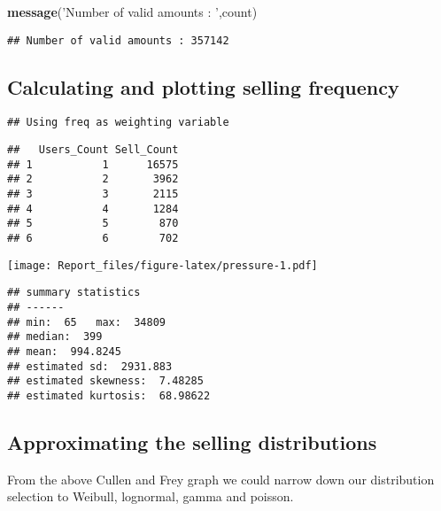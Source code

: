 \documentclass[]{article}
\newenvironment{Shaded}{\begin{snugshade}}{\end{snugshade}}
\newcommand{\KeywordTok}[1]{\textcolor[rgb]{0.13,0.29,0.53}{\textbf{#1}}}
\newcommand{\StringTok}[1]{\textcolor[rgb]{0.31,0.60,0.02}{#1}}
\newcommand{\NormalTok}[1]{#1}
\begin{document}
\begin{Shaded}
\begin{Highlighting}[]
\KeywordTok{message}\NormalTok{(}\StringTok{'Number of valid amounts : '}\NormalTok{,count)}
\end{Highlighting}
\end{Shaded}

\begin{verbatim}
## Number of valid amounts : 357142
\end{verbatim}

\subsection{Calculating and plotting selling
frequency}\label{calculating-and-plotting-selling-frequency}

\begin{verbatim}
## Using freq as weighting variable
\end{verbatim}

\begin{verbatim}
##   Users_Count Sell_Count
## 1           1      16575
## 2           2       3962
## 3           3       2115
## 4           4       1284
## 5           5        870
## 6           6        702
\end{verbatim}

\texttt{[image: Report\_files/figure-latex/pressure-1.pdf]}

\begin{verbatim}
## summary statistics
## ------
## min:  65   max:  34809 
## median:  399 
## mean:  994.8245 
## estimated sd:  2931.883 
## estimated skewness:  7.48285 
## estimated kurtosis:  68.98622
\end{verbatim}

\subsection{Approximating the selling
distributions}\label{approximating-the-selling-distributions}

From the above Cullen and Frey graph we could narrow down our
distribution selection to Weibull, lognormal, gamma and poisson.
\end{document}
